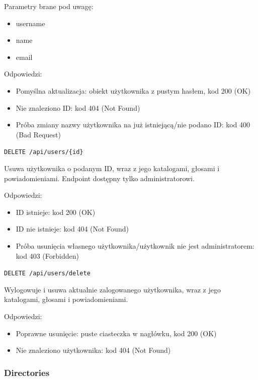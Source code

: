 \documentclass[a4paper,twoside,12pt]{book}
\begin{document}
Parametry brane pod uwagę: 
\begin{itemize}
	\item  username \item  name \item  email
\end{itemize}

Odpowiedzi: 
\begin{itemize}
	\item Pomyślna aktualizacja: obiekt użytkownika z pustym hasłem, kod 200 (OK) 
	\item Nie znaleziono ID: kod 404 (Not Found) 
	\item  Próba zmiany nazwy użytkownika na już istniejącą/nie podano ID: kod 400 (Bad Request)
\end{itemize}

\label{delete-user}

\texttt{DELETE\ /api/users/\{id\}}

Usuwa użytkownika o podanym ID, wraz z jego katalogami, głosami i powiadomieniami. Endpoint dostępny tylko administratorowi.

Odpowiedzi: 
\begin{itemize}
	\item ID istnieje: kod 200 (OK) 
	\item ID nie istnieje: kod 404 (Not Found) 
	\item Próba usunięcia własnego użytkownika/użytkownik nie jest administratorem: kod 403 (Forbidden)
\end{itemize}

\label{delete-my-user}

\texttt{DELETE\ /api/users/delete}

Wylogowuje i usuwa aktualnie zalogowanego użytkownika, wraz z jego katalogami, głosami i powiadomieniami.

Odpowiedzi: 
\begin{itemize}
	\item  Poprawne usunięcie: puste ciasteczka w nagłówku, kod 200 (OK) 
	\item  Nie znaleziono użytkownika: kod 404 (Not Found)
\end{itemize}

\subsubsection{Directories}\label{directories}

\label{get-my-base-directory}
\end{document}
